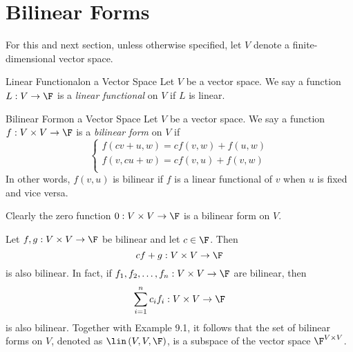 \documentclass[linearalgebra]{subfiles}
\begin{document}

    \section{Bilinear Forms}

    \begin{remark}
        For this and next section, unless otherwise specified, let $V$ denote a finite-dimensional vector space.
    \end{remark}

    \begin{recall}{Linear Functional}{on a Vector Space}
        Let $V$ be a vector space. We say a function $L:V\to\F$ is a \emph{linear functional} on $V$ if $L$ is linear.
    \end{recall}

    \begin{definition}{Bilinear Form}{on a Vector Space}
        Let $V$ be a vector space. We say a function $f:V\times V\to\F$ is a \emph{bilinear form} on $V$ if
        \begin{equation*}
            \begin{cases}
                f(cv+u,w) = cf(v,w)+f(u,w) \\
                f(v,cu+w) = cf(v,u)+f(v,w) \\
            \end{cases}
        \end{equation*}
        In other words, $f(v,u)$ is bilinear if $f$ is a linear functional of $v$ when $u$ is fixed and vice versa.
    \end{definition}

    \begin{example}
        Clearly the zero function $0:V\times V\to \F$ is a bilinear form on $V$.
    \end{example}

    \begin{remark}
        Let $f,g:V\times V\to\F$ be bilinear and let $c\in\F$. Then
        \begin{equation*}
            cf+g:V\times V\to\F
        \end{equation*}
        is also bilinear. In fact, if $f_1,f_2,\ldots,f_n: V\times V\to\F$ are bilinear, then
        \begin{equation*}
            \sum^{n}_{i=1} c_if_i: V\times V\to\F 
        \end{equation*}
        is also bilinear. Together with Example 9.1, it follows that the set of bilinear forms on $V$, denoted as $\lin\left( V,V,\F \right)$, is a subspace of the vector space $\F^{V\times V}$.
    \end{remark}
\end{document}
